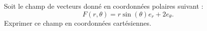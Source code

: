 
\begin{exercice}\label{exoOutilsMath-0080}

    Soit le champ de vecteurs donné en coordonnées polaires suivant :
    \begin{equation}
        F(r,\theta)=r\sin(\theta)e_r+2e_{\theta}.
    \end{equation}
    Exprimer ce champ en coordonnées cartésiennes.

\end{exercice}

